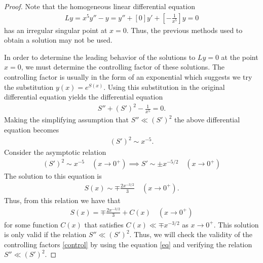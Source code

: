 \documentclass[12pt]{article}
\theoremstyle{definition}
\begin{document}
\begin{proof}
  Note that the homogeneous linear differential equation
  \begin{align*}
    Ly = x^5y'' - y = y'' + [0]y' + \left[-\frac{1}{x^5}\right] y = 0
  \end{align*}
  has an irregular singular point at $x=0$. Thus, the previous methods used to obtain a solution may not be used.

  In order to determine the leading behavior of the solutions to $Ly=0$ at the point $x=0$, we must determine the controlling
  factor of these solutions. The controlling factor is usually in the form of an exponential which suggests we try the substitution $y(x) = e^{S(x)}$. Using this substitution in the original
  differential equation yields the differential equation
  \begin{align*}
    S'' + (S')^2 - \frac{1}{x^5} = 0.
  \end{align*}
  Making the simplifying assumption that $S'' \ll (S')^2 $ the above differential equation becomes
  \begin{align*}
    (S')^2 \sim x^{-5}.
  \end{align*}
  Consider the asymptotic relation
  \begin{align*}
    (S')^2 \sim x^{-5} \quad (x\to 0^+) \implies
    S' \sim \pm x^{-5/2} \quad (x\to 0^+)
  \end{align*}
  The solution to this equation is
  \begin{align}\label{control}
    S(x) \sim \mp\frac{2x^{-3/2}}{3} \quad (x\to 0^+).
  \end{align}
  Thus, from this relation we have that
  \begin{align}\label{eq}
    S(x) = \mp\frac{2x^{-3/2}}{3} + C(x) \quad (x\to 0^+)
  \end{align}
  for some function $C(x)$ that satisfies $C(x) \ll \mp x^{-3/2}$ as $x\to 0^+$.
  This solution is only valid if the relation $S'' \ll (S')^2$. Thus, we will check the validity of the controlling factors \eqref{control}
  by using the equation \eqref{eq} and verifying the relation $S'' \ll (S')^2$.


\end{proof}
\end{document}
